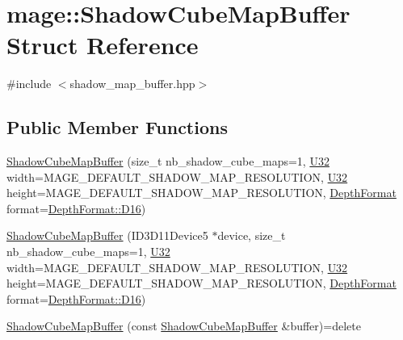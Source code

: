 \hypertarget{structmage_1_1_shadow_cube_map_buffer}{}\section{mage\+:\+:Shadow\+Cube\+Map\+Buffer Struct Reference}
\label{structmage_1_1_shadow_cube_map_buffer}


{\ttfamily \#include $<$shadow\+\_\+map\+\_\+buffer.\+hpp$>$}

\subsection*{Public Member Functions}
\begin{DoxyCompactItemize}
\item 
\hyperlink{structmage_1_1_shadow_cube_map_buffer_a5dfc8bb6a335ce640cffbaf823657cb7}{Shadow\+Cube\+Map\+Buffer} (size\+\_\+t nb\+\_\+shadow\+\_\+cube\+\_\+maps=1, \hyperlink{namespacemage_a41c104c036fba3756a74e19f793eeaa1}{U32} width=M\+A\+G\+E\+\_\+\+D\+E\+F\+A\+U\+L\+T\+\_\+\+S\+H\+A\+D\+O\+W\+\_\+\+M\+A\+P\+\_\+\+R\+E\+S\+O\+L\+U\+T\+I\+ON, \hyperlink{namespacemage_a41c104c036fba3756a74e19f793eeaa1}{U32} height=M\+A\+G\+E\+\_\+\+D\+E\+F\+A\+U\+L\+T\+\_\+\+S\+H\+A\+D\+O\+W\+\_\+\+M\+A\+P\+\_\+\+R\+E\+S\+O\+L\+U\+T\+I\+ON, \hyperlink{namespacemage_aed4c3f883a30484d0a20762c06be81d4}{Depth\+Format} format=\hyperlink{namespacemage_aed4c3f883a30484d0a20762c06be81d4a6fd9ec81643ee5a57f85a71951bfe13d}{Depth\+Format\+::\+D16})
\item 
\hyperlink{structmage_1_1_shadow_cube_map_buffer_a6443980c955e54c1de336fa2d05fa5ec}{Shadow\+Cube\+Map\+Buffer} (I\+D3\+D11\+Device5 $\ast$device, size\+\_\+t nb\+\_\+shadow\+\_\+cube\+\_\+maps=1, \hyperlink{namespacemage_a41c104c036fba3756a74e19f793eeaa1}{U32} width=M\+A\+G\+E\+\_\+\+D\+E\+F\+A\+U\+L\+T\+\_\+\+S\+H\+A\+D\+O\+W\+\_\+\+M\+A\+P\+\_\+\+R\+E\+S\+O\+L\+U\+T\+I\+ON, \hyperlink{namespacemage_a41c104c036fba3756a74e19f793eeaa1}{U32} height=M\+A\+G\+E\+\_\+\+D\+E\+F\+A\+U\+L\+T\+\_\+\+S\+H\+A\+D\+O\+W\+\_\+\+M\+A\+P\+\_\+\+R\+E\+S\+O\+L\+U\+T\+I\+ON, \hyperlink{namespacemage_aed4c3f883a30484d0a20762c06be81d4}{Depth\+Format} format=\hyperlink{namespacemage_aed4c3f883a30484d0a20762c06be81d4a6fd9ec81643ee5a57f85a71951bfe13d}{Depth\+Format\+::\+D16})
\item 
\hyperlink{structmage_1_1_shadow_cube_map_buffer_afe0bdf6a81df1a3efde7d34b65f4e351}{Shadow\+Cube\+Map\+Buffer} (const \hyperlink{structmage_1_1_shadow_cube_map_buffer}{Shadow\+Cube\+Map\+Buffer} \&buffer)=delete

\end{DoxyCompactItemize}
